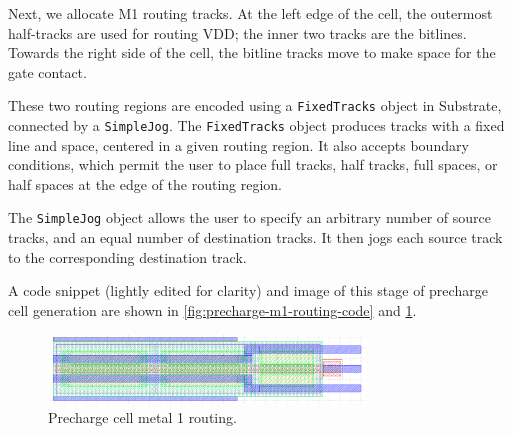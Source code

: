Next, we allocate M1 routing tracks. At the left edge of the cell, the outermost half-tracks are used for routing VDD;
the inner two tracks are the bitlines. Towards the right side of the cell,
the bitline tracks move to make space for the gate contact.

These two routing regions are encoded using a \verb|FixedTracks| object in Substrate, connected by a \verb|SimpleJog|.
The \verb|FixedTracks| object produces tracks with a fixed line and space, centered in a given routing region.
It also accepts boundary conditions, which permit the user to place full tracks, half tracks, full spaces, or half spaces
at the edge of the routing region.

The \verb|SimpleJog| object allows the user to specify an arbitrary number of source tracks, and an equal number of destination tracks.
It then jogs each source track to the corresponding destination track.

A code snippet (lightly edited for clarity) and image of this stage of precharge cell generation are shown in \ref{fig:precharge-m1-routing-code} and \ref{fig:precharge-m1-routing}.

\begin{figure}[H] \centering
\includegraphics[width=0.75\textwidth]{figures/precharge_m1_routing.png}
\caption{Precharge cell metal 1 routing. \label{fig:precharge-m1-routing}}
\end{figure}


